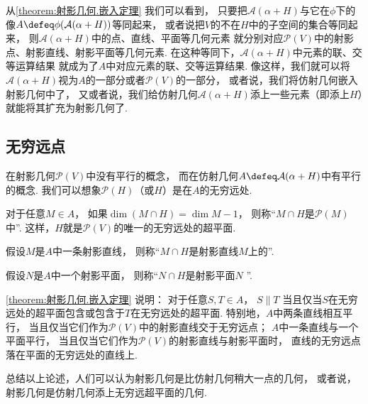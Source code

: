 \begin{remark}
从\cref{theorem:射影几何.嵌入定理} 我们可以看到，
只要把\(\mathcal{A}(\alpha + H)\)与它在\(\phi\)下的像\(A \defeq \phi(\mathcal{A}(\alpha + H))\)等同起来，
或者说把\(V\)的不在\(H\)中的子空间的集合等同起来，
则\(\mathcal{A}(\alpha + H)\)中的点、直线、平面等几何元素
就分别对应\(\mathcal{P}(V)\)中的射影点、射影直线、射影平面等几何元素.
在这种等同下，\(\mathcal{A}(\alpha + H)\)中元素的联、交等运算结果
就成为了\(A\)中对应元素的联、交等运算结果.
像这样，我们就可以将\(\mathcal{A}(\alpha + H)\)视为\(A\)的一部分或者\(\mathcal{P}(V)\)的一部分，
或者说，我们将仿射几何嵌入射影几何中了，
又或者说，我们给仿射几何\(\mathcal{A}(\alpha + H)\)添上一些元素（即添上\(H\)）就能将其扩充为射影几何了.
\end{remark}

\subsection{无穷远点}
在射影几何\(\mathcal{P}(V)\)中没有平行的概念，
而在仿射几何\(A \defeq \mathcal{A}(\alpha + H)\)中有平行的概念.
我们可以想象\(\mathcal{P}(H)\)（或\(H\)）是在\(A\)的无穷远处.

对于任意\(M \in A\)，
如果\(\dim(M \cap H) = \dim M - 1\)，
则称“\(M \cap H\)是\(\mathcal{P}(M)\)中”.
这样，\(H\)就是\(\mathcal{P}(V)\)的唯一的无穷远处的超平面.

假设\(M\)是\(A\)中一条射影直线，
则称“\(M \cap H\)是射影直线\(M\)上的”.

假设\(N\)是\(A\)中一个射影平面，
则称“\(N \cap H\)是射影平面\(N\) ”.

\cref{theorem:射影几何.嵌入定理} 说明：
对于任意\(S,T \in A\)，
\(S \parallel T\)
当且仅当\(S\)在无穷远处的超平面包含或包含于\(T\)在无穷远处的超平面.
特别地，\(A\)中两条直线相互平行，
当且仅当它们作为\(\mathcal{P}(V)\)中的射影直线交于无穷远点；
\(A\)中一条直线与一个平面平行，
当且仅当它们作为\(\mathcal{P}(V)\)的射影直线与射影平面时，
直线的无穷远点落在平面的无穷远处的直线上.

总结以上论述，人们可以认为射影几何是比仿射几何稍大一点的几何，
或者说，射影几何是仿射几何添上无穷远超平面的几何.


